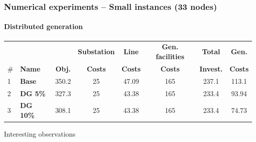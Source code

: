 \documentclass{beamer}
\begin{document}
\begin{frame}
\frametitle{Numerical experiments -- Small instances (33 nodes)}
\framesubtitle{Distributed generation}
\begin{table}[htbp]
\tiny
  \centering
	\begin{tabular}{l|l|c|c|c|c|c|c}
    \hline
    & &       & \textbf{Substation} & \textbf{Line} & \textbf{Gen. facilities} & \textbf{Total} & \textbf{Gen.} \\
    \# & \textbf{Name} & \textbf{Obj.} & \textbf{Costs} & \textbf{Costs} & \textbf{Costs} & \textbf{Invest.} & \textbf{Costs} \\ \hline
    1 & \textbf{Base} & 350.2 & 25    & 47.09 & 165   & 237.1 & 113.1 \\ \hline
    2 & \textbf{DG 5\%} & 327.3 & 25    & 43.38 & 165   & 233.4 & 93.94 \\
    3 & \textbf{DG 10\%} & 308.1 & 25    & 43.38 & 165   & 233.4 & 74.73 \\
    \hline
    \end{tabular}%
\end{table}%
\normalsize
\begin{block}{Interesting observations}
\end{block}
\end{frame}
\end{document}
